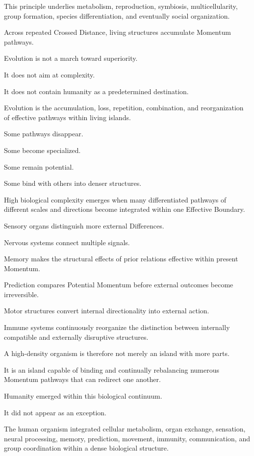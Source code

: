 This principle underlies metabolism, reproduction, symbiosis, multicellularity, group formation, species differentiation, and eventually social organization.

Across repeated Crossed Distance, living structures accumulate Momentum pathways.

Evolution is not a march toward superiority.

It does not aim at complexity.

It does not contain humanity as a predetermined destination.

Evolution is the accumulation, loss, repetition, combination, and reorganization of effective pathways within living islands.

Some pathways disappear.

Some become specialized.

Some remain potential.

Some bind with others into denser structures.

High biological complexity emerges when many differentiated pathways of different scales and directions become integrated within one Effective Boundary.

Sensory organs distinguish more external Differences.

Nervous systems connect multiple signals.

Memory makes the structural effects of prior relations effective within present Momentum.

Prediction compares Potential Momentum before external outcomes become irreversible.

Motor structures convert internal directionality into external action.

Immune systems continuously reorganize the distinction between internally compatible and externally disruptive structures.

A high-density organism is therefore not merely an island with more parts.

It is an island capable of binding and continually rebalancing numerous Momentum pathways that can redirect one another.

Humanity emerged within this biological continuum.

It did not appear as an exception.

The human organism integrated cellular metabolism, organ exchange, sensation, neural processing, memory, prediction, movement, immunity, communication, and group coordination within a dense biological structure.


